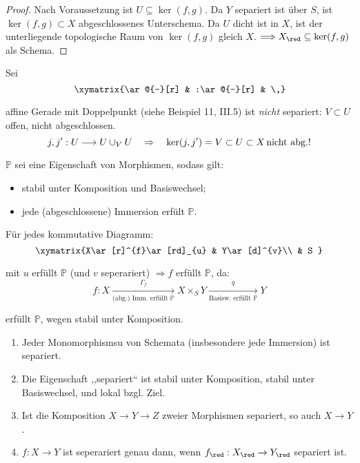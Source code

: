 \begin{proof}
  Nach Voraussetzung ist $U\subseteq\ker(f,g)$. Da $Y$ separiert ist
  über $S$, ist $\ker(f,g)\subset X$ abgeschlossenes Unterschema.
  Da $U$ dicht ist in $X$, ist der unterliegende topologische Raum
  von $\ker(f,g)$ gleich $X$. $\Longrightarrow X_{\red}\subseteq\ker(f,g)$
  als Schema.
\end{proof}
\begin{example}[32]
  Sei
  \[
    \,\xymatrix{\ar@{-}[r] & :\ar@{-}[r] & \,}
  \]

  affine Gerade mit Doppelpunkt (siehe Beispiel 11, III.5) ist \emph{nicht}
  separiert: $V\subset U$ offen, nicht abgeschlossen.
  \[
    j,j':U\longrightarrow U\cup_{V}U\quad\Rightarrow\quad\ker(j,j')=V\subset U\subset X\text{\,nicht abg.!}
  \]
\end{example}

\begin{rem}[33]
  $\mathbb{P}$ sei eine Eigenschaft von Morphismen, sodass gilt:
  \begin{itemize}
  \item stabil unter Komposition und Basiswechsel;
  \item jede (abgeschlossene) Immersion erfült $\mathbb{P}$.
  \end{itemize}
  Für jedes kommutative Diagramm:
  \[
    \xymatrix{X\ar[r]^{f}\ar[rd]_{u} & Y\ar[d]^{v}\\
      & S
    }
  \]

  mit $u$ erfüllt $\mathbb{P}$ (und $v$ seperariert) $\Longrightarrow f$
  erfüllt $\mathbb{P}$, da:
  \[
    f:X\xrightarrow[\text{(abg.) Imm. erfüllt }\mathbb{P}]{\Gamma_{f}}X\times_{S}Y\xrightarrow[\text{Basisw. erfüllt }\mathbb{P}]{q}Y
  \]

  erfüllt $\mathbb{P}$, wegen stabil unter Komposition.
\end{rem}

\begin{prop}
  \mbox{}
  \begin{enumerate}
  \item Jeder Monomorphismsu von Schemata (insbesondere jede Immersion) ist
    separiert.
  \item Die Eigenschaft ,,separiert`` ist stabil unter Komposition, stabil
    unter Basiswechsel, und lokal bzgl. Ziel.
  \item Ist die Komposition $X\rightarrow Y\rightarrow Z$ zweier Morphismen
    separiert, so auch $X\rightarrow Y$.
  \item $f:X\rightarrow Y$ ist seperariert genau dann, wenn $f_{\red}:X_{\red}\rightarrow Y_{\red}$
    separiert ist.
  \end{enumerate}
\end{prop}

